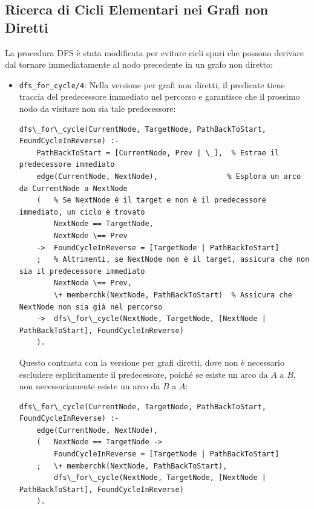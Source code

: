 \documentclass[12pt,a4paper]{article}
\begin{document}
\subsection{Ricerca di Cicli Elementari nei Grafi non Diretti}
La procedura DFS è stata modificata per evitare cicli spuri che possono derivare dal tornare immediatamente al nodo precedente in un grafo non diretto:

\begin{itemize}
\item \texttt{dfs\_for\_cycle/4}: Nella versione per grafi non diretti, il predicate tiene traccia del predecessore immediato nel percorso e garantisce che il prossimo nodo da visitare non sia tale predecessore:

\begin{lstlisting}[style=prologstyle, basicstyle=\ttfamily\footnotesize]
dfs\_for\_cycle(CurrentNode, TargetNode, PathBackToStart, FoundCycleInReverse) :-
    PathBackToStart = [CurrentNode, Prev | \_],  % Estrae il predecessore immediato
    edge(CurrentNode, NextNode),                % Esplora un arco da CurrentNode a NextNode
    (   % Se NextNode è il target e non è il predecessore immediato, un ciclo è trovato
        NextNode == TargetNode,
        NextNode \== Prev
    ->  FoundCycleInReverse = [TargetNode | PathBackToStart]
    ;   % Altrimenti, se NextNode non è il target, assicura che non sia il predecessore immediato
        NextNode \== Prev,
        \+ memberchk(NextNode, PathBackToStart)  % Assicura che NextNode non sia già nel percorso
    ->  dfs\_for\_cycle(NextNode, TargetNode, [NextNode | PathBackToStart], FoundCycleInReverse)
    ).
\end{lstlisting}

Questo contrasta con la versione per grafi diretti, dove non è necessario escludere esplicitamente il predecessore, poiché se esiste un arco da $A$ a $B$, non necessariamente esiste un arco da $B$ a $A$:

\begin{lstlisting}[style=prologstyle, basicstyle=\ttfamily\footnotesize]
dfs\_for\_cycle(CurrentNode, TargetNode, PathBackToStart, FoundCycleInReverse) :-
    edge(CurrentNode, NextNode),
    (   NextNode == TargetNode ->
        FoundCycleInReverse = [TargetNode | PathBackToStart]
    ;   \+ memberchk(NextNode, PathBackToStart),
        dfs\_for\_cycle(NextNode, TargetNode, [NextNode | PathBackToStart], FoundCycleInReverse)
    ).
\end{lstlisting}
\end{itemize}
\end{document}
